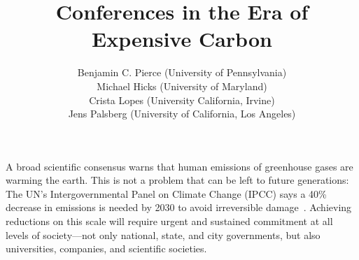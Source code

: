 \documentclass[12pt]{article}
\begin{document}
\title{\Huge Conferences in the Era of Expensive Carbon}
\author{Benjamin C. Pierce (University of Pennsylvania) \\
Michael Hicks (University of Maryland) \\
Crista Lopes (University California, Irvine) \\
Jens Palsberg (University of California, Los Angeles)}

\maketitle




A broad scientific consensus warns that human
emissions of greenhouse gases are warming the earth.
This is not a problem that can be left to future
generations: The UN's Intergovernmental
Panel on Climate Change (IPCC) says a 40\% decrease in
emissions is needed by 2030 to avoid irreversible damage~\cite{IPCC18}.
Achieving reductions on this scale will
require urgent and sustained commitment at all levels of society---not only
national, state, and city governments, but also 
universities, companies, and scientific societies. 


\end{document}
